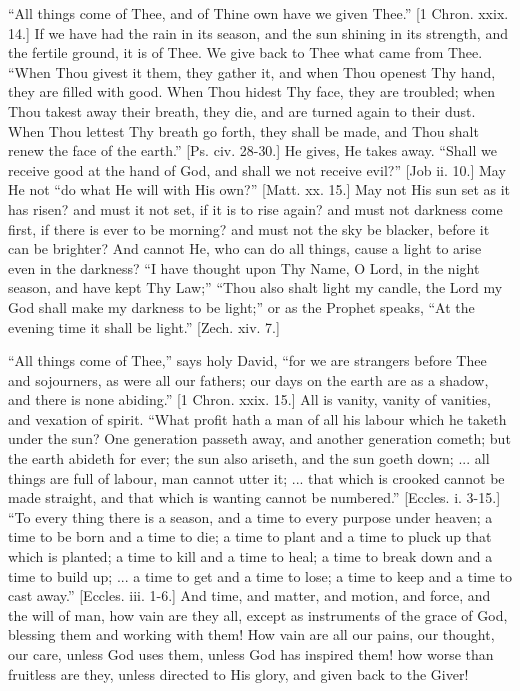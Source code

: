 ``All things come of Thee, and of Thine own have we given
Thee.'' [1 Chron. xxix. 14.] If we have had the rain in its
season, and the sun shining in its strength, and the fertile ground,
it is of Thee. We give back to Thee what came from Thee. ``When
Thou givest it them, they gather it, and when Thou openest Thy hand,
they are filled with good. When Thou hidest Thy face, they are
troubled; when Thou takest away their breath, they die, and are turned
again to their dust. When Thou lettest Thy breath go forth, they shall
be made, and Thou shalt renew the face of the earth.'' [Ps. civ.
28-30.] He gives, He takes away. ``Shall we receive good at the
hand of God, and shall we not receive evil?'' [Job ii. 10.] May He
not ``do what He will with His own?'' [Matt. xx. 15.] May not
His sun set as it has risen? and must it not set, if it is to rise
again? and must not darkness come first, if there is ever to be
morning? and must not the sky be blacker, before it can be brighter?
And cannot He, who can do all things, cause a light to arise even in
the darkness? ``I have thought upon Thy Name, O Lord, in the night
season, and have kept Thy Law;'' ``Thou also shalt light my
candle, the Lord my God shall make my darkness to be light;'' or
as the Prophet speaks, ``At the evening time it shall be
light.'' [Zech. xiv. 7.]

``All things come of Thee,'' says holy David, ``for we
are strangers before Thee and sojourners, as were all our fathers; our
days on the earth are as a shadow, and there is none abiding.'' [1
Chron. xxix. 15.] All is vanity, vanity of vanities, and vexation of
spirit. ``What profit hath a man of all his labour which he taketh
under the sun? One generation passeth away, and another generation
cometh; but the earth abideth for ever; the sun also ariseth, and the
sun goeth down; ... all things are full of labour, man cannot utter
it; ... that which is crooked cannot be made straight, and that which
is wanting cannot be numbered.'' [Eccles. i. 3-15.] ``To every
thing there is a season, and a time to every purpose under heaven; a
time to be born and a time to die; a time to plant and a time to pluck
up that which is planted; a time to kill and a time to heal; a time to
break down and a time to build up; ... a time to get and a time to
lose; a time to keep and a time to cast away.'' [Eccles. iii.
1-6.] And time, and matter, and motion, and force, and the will of
man, how vain are they all, except as instruments of the grace of God,
blessing them and working with them! How vain are all our pains, our
thought, our care, unless God uses them, unless God has inspired them!
how worse than fruitless are they, unless directed to His glory, and
given back to the Giver!

